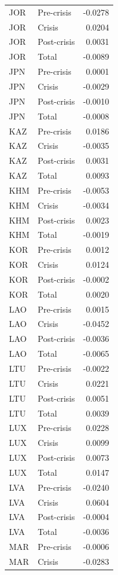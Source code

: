 \begin{longtable}[t]{llr}
JOR & Pre-crisis & -0.0278\\
JOR & Crisis & 0.0204\\
\addlinespace
JOR & Post-crisis & 0.0031\\
JOR & Total & -0.0089\\
JPN & Pre-crisis & 0.0001\\
JPN & Crisis & -0.0029\\
JPN & Post-crisis & -0.0010\\
\addlinespace
JPN & Total & -0.0008\\
KAZ & Pre-crisis & 0.0186\\
KAZ & Crisis & -0.0035\\
KAZ & Post-crisis & 0.0031\\
KAZ & Total & 0.0093\\
\addlinespace
KHM & Pre-crisis & -0.0053\\
KHM & Crisis & -0.0034\\
KHM & Post-crisis & 0.0023\\
KHM & Total & -0.0019\\
KOR & Pre-crisis & 0.0012\\
\addlinespace
KOR & Crisis & 0.0124\\
KOR & Post-crisis & -0.0002\\
KOR & Total & 0.0020\\
LAO & Pre-crisis & 0.0015\\
LAO & Crisis & -0.0452\\
\addlinespace
LAO & Post-crisis & -0.0036\\
LAO & Total & -0.0065\\
LTU & Pre-crisis & -0.0022\\
LTU & Crisis & 0.0221\\
LTU & Post-crisis & 0.0051\\
\addlinespace
LTU & Total & 0.0039\\
LUX & Pre-crisis & 0.0228\\
LUX & Crisis & 0.0099\\
LUX & Post-crisis & 0.0073\\
LUX & Total & 0.0147\\
\addlinespace
LVA & Pre-crisis & -0.0240\\
LVA & Crisis & 0.0604\\
LVA & Post-crisis & -0.0004\\
LVA & Total & -0.0036\\
MAR & Pre-crisis & -0.0006\\
\addlinespace
MAR & Crisis & -0.0283\\

\end{longtable}
